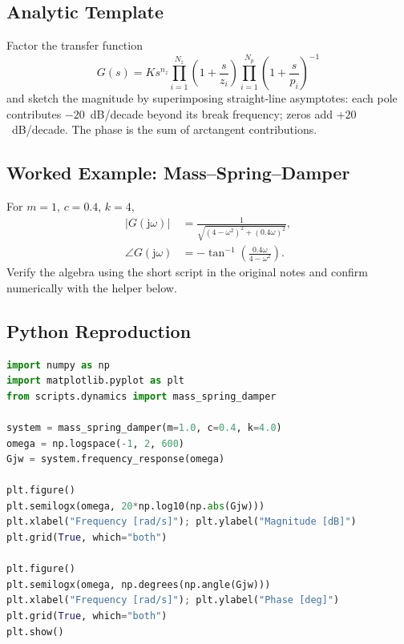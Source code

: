\subsection{Analytic Template}
Factor the transfer function
\[
    G(s) = K s^{n_z} \prod_{i=1}^{N_z} \left(1 + \frac{s}{z_i}\right) \prod_{i=1}^{N_p} \left(1 + \frac{s}{p_i}\right)^{-1}
\]
and sketch the magnitude by superimposing straight-line asymptotes: each pole contributes $-20$~dB/decade beyond its break frequency; zeros add $+20$~dB/decade. The phase is the sum of arctangent contributions.

\subsection{Worked Example: Mass--Spring--Damper}
For $m=1$, $c=0.4$, $k=4$,
\begin{align*}
    |G(\mathrm{j}\omega)| &= \frac{1}{\sqrt{(4 - \omega^2)^2 + (0.4 \omega)^2}},\\
    \angle G(\mathrm{j}\omega) &= -\tan^{-1}\!\left(\frac{0.4 \omega}{4 - \omega^2}\right).
\end{align*}
Verify the algebra using the short script in the original notes and confirm numerically with the helper below.

\subsection{Python Reproduction}
\begin{lstlisting}[language=python]
import numpy as np
import matplotlib.pyplot as plt
from scripts.dynamics import mass_spring_damper

system = mass_spring_damper(m=1.0, c=0.4, k=4.0)
omega = np.logspace(-1, 2, 600)
Gjw = system.frequency_response(omega)

plt.figure()
plt.semilogx(omega, 20*np.log10(np.abs(Gjw)))
plt.xlabel("Frequency [rad/s]"); plt.ylabel("Magnitude [dB]")
plt.grid(True, which="both")

plt.figure()
plt.semilogx(omega, np.degrees(np.angle(Gjw)))
plt.xlabel("Frequency [rad/s]"); plt.ylabel("Phase [deg]")
plt.grid(True, which="both")
plt.show()
\end{lstlisting}

